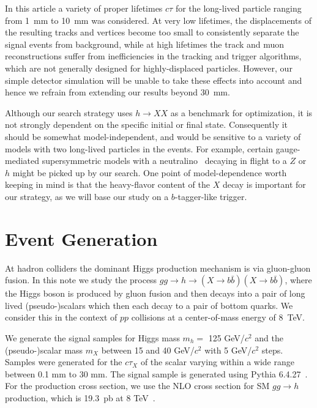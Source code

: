 \documentclass{JHEP3}
\begin{document}
In this article a variety of proper lifetimes $c\tau$ for the long-lived particle ranging from 1~mm to
10~mm was considered. At very low lifetimes, the displacements of the resulting tracks and vertices become
too small to consistently separate the signal events from background, while at high lifetimes the track
and muon reconstructions suffer from inefficiencies in the tracking and trigger algorithms, which are not
generally designed for highly-displaced particles. However, our simple detector simulation will be unable
to take these effects into account and hence we refrain from extending our results beyond 30~mm.

Although our search strategy uses $h\to XX$ as a benchmark for
optimization, it is not strongly dependent on the specific initial or
final state.  Consequently it should be somewhat model-independent,
and would be sensitive to a variety of models with two long-lived
particles in the events. For example, certain gauge-mediated
supersymmetric models with a neutralino~\cite{MatchevThomas} decaying
in flight to a $Z$ or $h$ might be picked up by our search.  One point
of model-dependence worth keeping in mind is that the heavy-flavor
content of the $X$ decay is important for our strategy, as we will
base our study on a $b$-tagger-like trigger.

\section{Event Generation}
\label{sec:generation}
At hadron colliders the dominant Higgs production mechanism is via gluon-gluon fusion. In this note we study
the process $gg\rightarrow h\rightarrow(X\rightarrow b\bar{b})(X\rightarrow b\bar{b})$, where the Higgs boson
is produced by gluon fusion and then decays into a pair of long lived (pseudo-)scalars which then each decay
to a pair of bottom quarks. We consider this in the context of $pp$ collisions at a center-of-mass energy of
$8$~TeV.

We generate the signal samples for Higgs mass $m_h=$ 125 GeV/$c^2$ and the \linebreak (pseudo-)scalar mass
$m_X$ between 15 and 40 GeV/$c^2$ with 5 GeV/$c^2$ steps. Samples were generated for the $c\tau_X$ of the
scalar varying within a wide range between 0.1 mm to 30 mm.  The signal sample is generated using Pythia
6.4.27~\cite{Sjostrand:2006za}. For the production cross section, we use the NLO cross section for SM $gg
\rightarrow h$ production, which is 19.3~pb at 8 TeV~\cite{Heinemeyer:2013tqa}.
\end{document}
